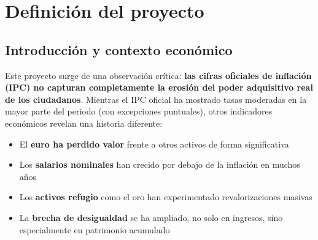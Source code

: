 \documentclass{article}
\begin{document}

\begin{abstract}
Durante el periodo 2010-2025, la econom\'ia espa\~nola ha atravesado m\'ultiples crisis que han impactado profundamente en el bienestar de los hogares. El periodo comenz\'o con las secuelas de la crisis financiera de 2008, continu\'o con la crisis de deuda europea (2010-2012), experiment\'o una recuperaci\'on moderada (2014-2019), enfrent\'o el shock de la pandemia COVID-19 (2020-2021), y recientemente ha vivido un repunte inflacionario sin precedentes (2021-2024) motivado por disrupciones en cadenas de suministro y tensiones geopol\'iticas.
\end{abstract}


\section{Definici\'on del proyecto}

\subsection{Introducci\'on y contexto econ\'omico}

Este proyecto surge de una observaci\'on cr\'itica: \textbf{las cifras oficiales de inflaci\'on (IPC) no capturan completamente la erosi\'on del poder adquisitivo real de los ciudadanos}. Mientras el IPC oficial ha mostrado tasas moderadas en la mayor parte del periodo (con excepciones puntuales), otros indicadores econ\'omicos revelan una historia diferente:

\begin{itemize}
    \item El \textbf{euro ha perdido valor} frente a otros activos de forma significativa
    \item Los \textbf{salarios nominales} han crecido por debajo de la inflaci\'on en muchos a\~nos
    \item Los \textbf{activos refugio} como el oro han experimentado revalorizaciones masivas
    \item La \textbf{brecha de desigualdad} se ha ampliado, no solo en ingresos, sino especialmente en patrimonio acumulado
\end{itemize}
\end{document}
